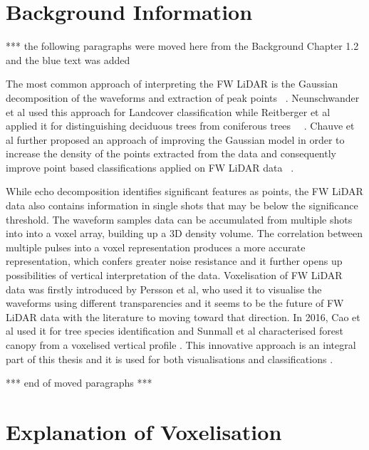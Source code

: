 \documentclass{subfiles}
\begin{document}
\section{Background Information}
		\par {\color{red} *** the following paragraphs were moved here from the Background Chapter 1.2 and the blue text was added}
		
		\par The most common approach of interpreting the FW LiDAR is the Gaussian decomposition of the waveforms and extraction of peak points ~\cite{Wanger2006}. Neunschwander et al used this approach for Landcover classification while Reitberger et al applied it for distinguishing deciduous trees from coniferous trees ~\cite{Neuenschwander2009}~\cite{Reitberger2008}. Chauve et al further proposed an approach of improving the Gaussian model in order to increase the density of the points extracted from the data and consequently improve point based classifications applied on FW LiDAR data ~\cite{Chauve2007}. 
		
		\par While echo decomposition identifies significant features as points, the FW LiDAR data also contains information in single shots that may be below the significance threshold. The waveform samples data can be accumulated from multiple shots into {\color{blue} into a voxel array, building up a 3D density volume. The correlation between multiple pulses into a voxel representation produces a more accurate representation, which confers greater noise resistance and it further opens up possibilities of vertical interpretation of the data.} Voxelisation {\color{blue} of FW LiDAR data} was firstly introduced by Persson et al, who used it to visualise the waveforms using different transparencies \cite{Persson2005} and it seems to be the future of FW LiDAR data with the literature to moving toward that direction. In 2016, Cao et al used it for tree species identification \cite{Cao2016} and Sunmall et al characterised forest canopy from a voxelised vertical profile \cite{Sumnall2016}. This innovative approach is an integral part of this thesis and it is used for both visualisations and classifications \cite{Miltiadou2014}\cite{Miltiadou2015}. 
		\par {\color{red} *** end of moved paragraphs *** }
		

	
\section{Explanation of Voxelisation}
\end{document}
